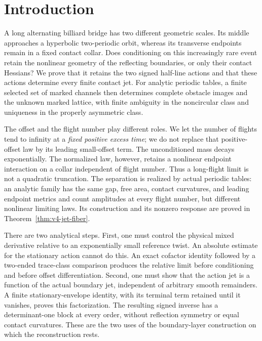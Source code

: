 \section{Introduction}
\label{sec:v56-introduction}

A long alternating billiard bridge has two different geometric scales.
Its middle approaches a hyperbolic two-periodic orbit, whereas its
transverse endpoints remain in a fixed contact collar.  Does conditioning
on this increasingly rare event retain the nonlinear geometry of the
reflecting boundaries, or only their contact Hessians?  We prove that it
retains the two signed half-line actions and that these actions determine
every finite contact jet.  For analytic periodic tables, a finite selected
set of marked channels then determines complete obstacle images and the
unknown marked lattice, with finite ambiguity in the noncircular class
and uniqueness in the properly asymmetric class.

The offset and the flight number play different roles.  We let the number
of flights tend to infinity at a \emph{fixed positive excess time}; we do
not replace that positive-offset law by its leading small-offset term.
The unconditioned mass decays exponentially.  The normalized law,
however, retains a nonlinear endpoint interaction on a collar independent
of flight number.  Thus a long-flight limit is not a quadratic truncation.
The separation is realized by actual periodic tables: an analytic family
has the same gap, free area, contact curvatures, and leading endpoint
metrics and count amplitudes at every flight number, but different
nonlinear limiting laws.  Its construction and its nonzero response are
proved in Theorem~\ref{thm:v4-jet-fiber}.

There are two analytical steps.  First, one must control the physical
mixed derivative relative to an exponentially small reference twist.
An absolute estimate for the stationary action cannot do this.  An exact
cofactor identity followed by a two-ended trace-class comparison produces
the relative limit before conditioning and before offset differentiation.
Second, one must show that the action jet is a function of the actual
boundary jet, independent of arbitrary smooth remainders.  A finite
stationary-envelope identity, with its terminal term retained until it
vanishes, proves this factorization.  The resulting signed inverse has a
determinant-one block at every order, without reflection symmetry or
equal contact curvatures.  These are the two uses of the boundary-layer
construction on which the reconstruction rests.

